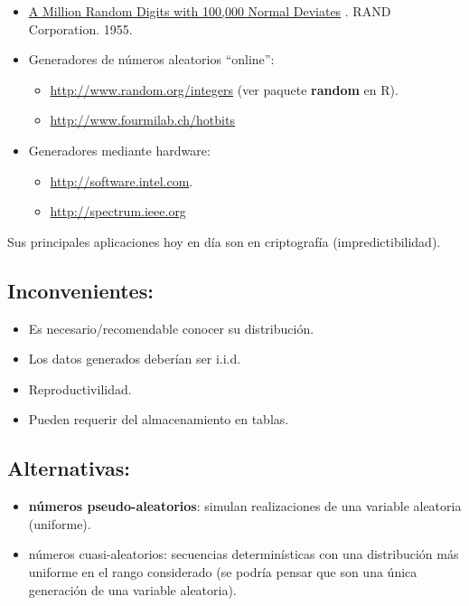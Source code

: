 \documentclass[]{book}
\theoremstyle{definition}
\theoremstyle{definition}
\theoremstyle{definition}
\theoremstyle{remark}
\begin{document}
\begin{itemize}
\item
  \href{https://en.wikipedia.org/wiki/A_Million_Random_Digits_with_100,000_Normal_Deviates}{A
  Million Random Digits with 100,000 Normal Deviates} . RAND
  Corporation. 1955.
\item
  Generadores de números aleatorios ``online'':

  \begin{itemize}
  \item
    \url{http://www.random.org/integers} (ver paquete \textbf{random} en
    R).
  \item
    \url{http://www.fourmilab.ch/hotbits}
  \end{itemize}
\item
  Generadores mediante hardware:

  \begin{itemize}
  \item
    \href{http://software.intel.com/en-us/articles/intel-digital-random-number-generator-drng-software-implementation-guide}{http://software.intel.com}.
  \item
    \href{http://spectrum.ieee.org/semiconductors/devices/a-memristor-true-randomnumber-generator}{http://spectrum.ieee.org}
  \end{itemize}
\end{itemize}

Sus principales aplicaciones hoy en día son en criptografía
(impredictibilidad).

\subsection{Inconvenientes:}\label{inconvenientes}

\begin{itemize}
\item
  Es necesario/recomendable conocer su distribución.
\item
  Los datos generados deberían ser i.i.d.
\item
  Reproductivilidad.
\item
  Pueden requerir del almacenamiento en tablas.
\end{itemize}

\subsection{Alternativas:}\label{alternativas}

\begin{itemize}
\item
  \textbf{números pseudo-aleatorios}: simulan realizaciones de una
  variable aleatoria (uniforme).
\item
  números cuasi-aleatorios: secuencias determinísticas con una
  distribución más uniforme en el rango considerado (se podría pensar
  que son una única generación de una variable aleatoria).
\end{itemize}
\end{document}
